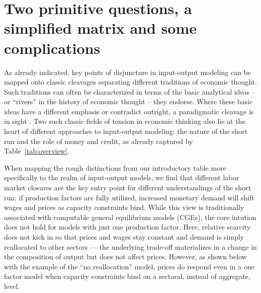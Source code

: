 \section{Two primitive questions, a simplified matrix and some complications}\label{sec:two-questions}

As already indicated, key points of disjuncture in input-output modeling can be mapped onto classic cleavages separating different traditions of economic thought. Such traditions can often be characterized in terms of the basic analytical ideas -- or ``rivers'' in the history of economic thought \citep[][p. 9]{Screpanti2005} -- they endorse. Where these basic ideas have a different emphasis or contradict outright, a paradigmatic cleavage is in sight \citep{Dobusch.2012}. Two such classic fields of tension in economic thinking also lie at the heart of different approaches to input-output modeling: the nature of the short run and the role of money and credit, as already captured by Table~\ref{tab:overview}.

When mapping the rough distinctions from our introductory table more specifically to the realm of input-output models, we find that different labor market closures are the key entry point for different understandings of the short run: if production factors are fully utilized, increased monetary demand will shift wages and prices as capacity constraints bind. While this view is traditionally associated with computable general equilibrium models (CGEs), the core intution does not hold for models with just one production factor. Here, relative scarcity does not kick in so that prices and wages stay constant and demand is simply reallocated to other sectors –– the underlying trade-off materializes in a change in the composition of output but does not affect prices. However, as shown below with the example of the ``no reallocation'' model, prices do respond even in a one factor model when capacity constraints bind on a sectoral, instead of aggregate, level.

